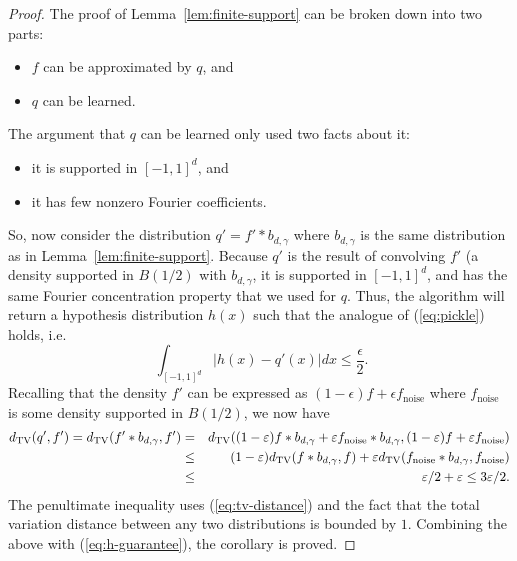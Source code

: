 \begin{proof}
The proof of Lemma~\ref{lem:finite-support} can be broken down into
two parts: 
\begin{itemize}
\item $f$ can be approximated by $q$, and
\item $q$ can be learned.
\end{itemize}
The argument that $q$ can be learned only used two facts about it:
\begin{itemize}
\item it is supported in $[-1,1]^d$, and
\item it has few nonzero Fourier coefficients.
\end{itemize}
So, now 
consider the distribution $q' = f' \ast b_{d,\gamma}$ where $b_{d,\gamma}$ is the same distribution as in Lemma~\ref{lem:finite-support}.
Because $q'$ is the result of convolving $f'$ (a density supported in $B(1/2)$ with $b_{d,\gamma}$, it is supported in 
$[-1,1]^d$, and has the same Fourier concentration property that
we used for $q$.  Thus,
the algorithm will return a hypothesis distribution $h(x)$ such that the analogue of (\ref{eq:pickle}) holds, i.e.
\begin{equation}~\label{eq:h-guarantee} \int_{[-1,1]^d} |h(x)  - q'(x)| dx \le \frac{\epsilon}{2}.\end{equation} 
Recalling that the density $f'$ can be expressed as 
$(1-\epsilon) f + \epsilon f_{\mathrm{noise}}$ where $f_{\mathrm{noise}}$ is some density supported in $B(1/2)$, we now have
\begin{eqnarray*}
d_\mathrm{TV}(q', f') = d_\mathrm{TV}(f' \ast b_{d,\gamma} , f') &=& d_\mathrm{TV}((1-\varepsilon) f \ast b_{d,\gamma} + \varepsilon f_{\mathrm{noise}} \ast b_{d,\gamma}, (1-\varepsilon) f + \varepsilon f_{\mathrm{noise}})  \\
&\le& (1-\varepsilon) d_\mathrm{TV}(f \ast b_{d,\gamma}, f) + \varepsilon d_\mathrm{TV}(f_{\mathrm{noise}} \ast b_{d,\gamma}, f_{\mathrm{noise}})\\
&\le& \varepsilon/2 + \varepsilon \le 3 \varepsilon/2. 
\end{eqnarray*}
The penultimate inequality uses (\ref{eq:tv-distance}) and the fact that the total variation distance between any two distributions is bounded by $1$. Combining the above with (\ref{eq:h-guarantee}), the corollary is proved.
\end{proof}

